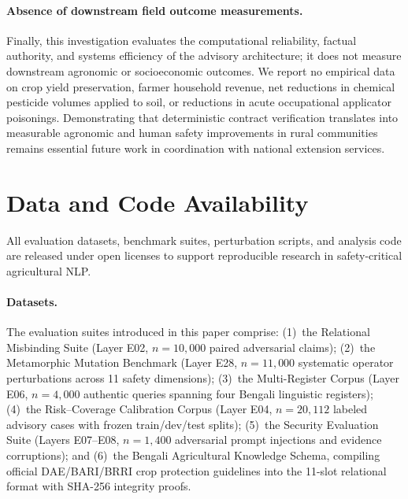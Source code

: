 \documentclass[a4paper,fleqn]{cas-dc}
\begin{document}
\paragraph{Absence of downstream field outcome measurements.}
Finally, this investigation evaluates the computational reliability, factual authority, and systems efficiency of the advisory architecture; it does not measure downstream agronomic or socioeconomic outcomes. We report no empirical data on crop yield preservation, farmer household revenue, net reductions in chemical pesticide volumes applied to soil, or reductions in acute occupational applicator poisonings. Demonstrating that deterministic contract verification translates into measurable agronomic and human safety improvements in rural communities remains essential future work in coordination with national extension services.

\section{Data and Code Availability}
\label{sec:data_availability}

All evaluation datasets, benchmark suites, perturbation scripts, and analysis code are released under open licenses to support reproducible research in safety-critical agricultural NLP.

\paragraph{Datasets.}
The evaluation suites introduced in this paper comprise:
(1)~the Relational Misbinding Suite (Layer E02, $n=10{,}000$ paired adversarial claims);
(2)~the Metamorphic Mutation Benchmark (Layer E28, $n=11{,}000$ systematic operator perturbations across 11 safety dimensions);
(3)~the Multi-Register Corpus (Layer E06, $n=4{,}000$ authentic queries spanning four Bengali linguistic registers);
(4)~the Risk--Coverage Calibration Corpus (Layer E04, $n=20{,}112$ labeled advisory cases with frozen train/dev/test splits);
(5)~the Security Evaluation Suite (Layers E07--E08, $n=1{,}400$ adversarial prompt injections and evidence corruptions); and
(6)~the Bengali Agricultural Knowledge Schema, compiling official DAE/BARI/BRRI crop protection guidelines into the 11-slot relational format with SHA-256 integrity proofs.
\end{document}
